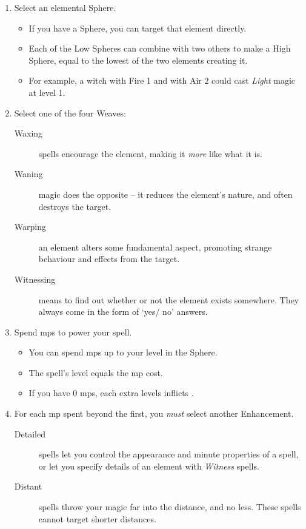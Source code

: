 \begin{multicols}{2}

\begin{enumerate}
  \item
  Select an elemental Sphere.
  \begin{itemize}
    \item
    If you have a Sphere, you can target that element directly.
    \item
    Each of the Low Spheres can combine with two others to make a High Sphere, equal to the lowest of the two elements creating it.
    \item
    For example, a witch with Fire 1 and with Air 2 could cast \textit{Light} magic at level 1.
  \end{itemize}
  \item
  Select one of the four Weaves:
  \begin{description}
    \item[Waxing]
    spells encourage the element, making it \emph{more} like what it is.
    \item[Waning]
    magic does the opposite -- it reduces the element's nature, and often destroys the target.
    \item[Warping]
    an element alters some fundamental aspect, promoting strange behaviour and effects from the target.
    \item[Witnessing]
    means to find out whether or not the element exists somewhere.
    They always come in the form of `yes/ no' answers.
  \end{description}
  \item
  Spend \glspl{mp} to power your spell.
  \begin{itemize}
    \item
    You can spend \glspl{mp} up to your level in the Sphere.
    \item
    The spell's level equals the \gls{mp} cost.
    \item
    If you have 0 \glspl{mp}, each extra levels inflicts .
  \end{itemize}
  \item
  For each \gls{mp} spent beyond the first, you \emph{must} select another Enhancement.
  \begin{description}
    \item[Detailed]
    spells let you control the appearance and minute properties of a spell, or let you specify details of an element with \textit{Witness} spells. 
    \item[Distant]
    spells throw your magic far into the distance, and no less.
    These spells cannot target shorter distances.


\end{description}
\end{enumerate}
\end{multicols}
